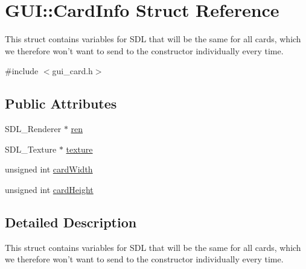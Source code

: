\hypertarget{structGUI_1_1CardInfo}{\section{G\-U\-I\-:\-:Card\-Info Struct Reference}
\label{structGUI_1_1CardInfo}
}


This struct contains variables for S\-D\-L that will be the same for all cards, which we therefore won't want to send to the constructor individually every time.  




{\ttfamily \#include $<$gui\-\_\-card.\-h$>$}

\subsection*{Public Attributes}
\begin{DoxyCompactItemize}
\item 
S\-D\-L\-\_\-\-Renderer $\ast$ \hyperlink{structGUI_1_1CardInfo_a6ee366c83b985779906ffd26adcbbd9d}{ren}
\item 
S\-D\-L\-\_\-\-Texture $\ast$ \hyperlink{structGUI_1_1CardInfo_a9ea2f3c5d4bcf977d2ecc94b1dda4e1b}{texture}
\item 
unsigned int \hyperlink{structGUI_1_1CardInfo_a61ab52dbaab60c9d44b67113ce4c4528}{card\-Width}
\item 
unsigned int \hyperlink{structGUI_1_1CardInfo_a17551b62ced18a32651d1dc46b8c8489}{card\-Height}
\end{DoxyCompactItemize}


\subsection{Detailed Description}
This struct contains variables for S\-D\-L that will be the same for all cards, which we therefore won't want to send to the constructor individually every time. 

